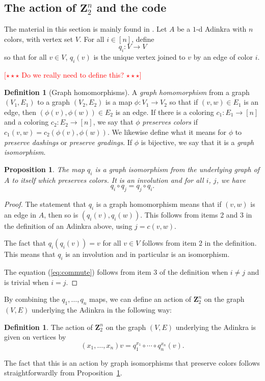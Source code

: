 \documentclass[12pt,twoside,singlespace]{article}
\numberwithin{equation}{section}
\newtheorem{prop}[equation]{Proposition}
\theoremstyle{definition}
\newtheorem{definition}[equation]{Definition}
\newcommand{\ZZ}{\mathbf{Z}}
\newcommand{\com}[1]{\textcolor{red}{$[\star \star \star$ #1 $\star \star \star]$}}
\begin{document}
\subsection{The action of $\ZZ_2^n$ and the code}
The material in this section is mainly found in \cite{d2l:omni}.  Let $A$ be a $1$-d Adinkra with $n$ colors, with vertex set $V$.  For all $i\in [n]$, define
\[q_i:V\to V\]
so that for all $v\in V$, $q_i(v)$ is the unique vertex joined to $v$ by an edge of color $i$.

\com{Do we really need to define this?}
\begin{definition}[Graph homomorphisms]
\label{defn:homomorphism}
A \emph{graph homomorphism} from a graph $(V_1,E_1)$ to a graph $(V_2,E_2)$ is a map $\phi:V_1\to V_2$ so that if $(v,w)\in E_1$ is an edge, then $(\phi(v),\phi(w))\in E_2$ is an edge.  If there is a coloring $c_1:E_1\to [n]$ and a coloring $c_2:E_2\to [n]$, we say that $\phi$ \emph{preserves colors} if $c_1(v,w)=c_2(\phi(v),\phi(w))$.  We likewise define what it means for $\phi$ to \emph{preserve dashings} or \emph{preserve gradings}.  If $\phi$ is bijective, we say that it is a \emph{graph isomorphism}.
\end{definition}

\begin{prop}
\label{prop:qmap}
The map $q_i$ is a graph isomorphism from the underlying graph of $A$ to itself which preserves colors.  It is an involution and for all $i$, $j$, we have
\begin{equation}
q_i\circ q_j=q_j\circ q_i.\label{eq:commute}
\end{equation}
\end{prop}
\begin{proof}
The statement that $q_i$ is a graph homomorphism means that if $(v,w)$ is an edge in $A$, then so is $(q_i(v),q_i(w))$.  This follows from items 2 and 3 in the definition of an Adinkra above, using $j=c(v,w)$.

The fact that $q_i(q_i(v))=v$ for all $v\in V$ follows from item 2 in the definition.  This means that $q_i$ is an involution and in particular is an isomorphism.

The equation (\ref{eq:commute}) follows from item 3 of the definition when $i\not=j$ and is trivial when $i=j$.
\end{proof}

By combining the $q_1,\ldots, q_n$ maps, we can define an action of $\ZZ_2^n$ on the graph $(V,E)$ underlying the Adinkra in the following way:
\begin{definition}
The action of $\ZZ_2^n$ on the graph $(V,E)$ underlying the Adinkra is given on vertices by
\[(x_1,\ldots,x_n)v=q_1^{x_1}\circ\cdots\circ q_n^{x_n}(v).\]
\end{definition}
The fact that this is an action by graph isomorphisms that preserve colors follows straightforwardly from Proposition~\ref{prop:qmap}.
\end{document}
